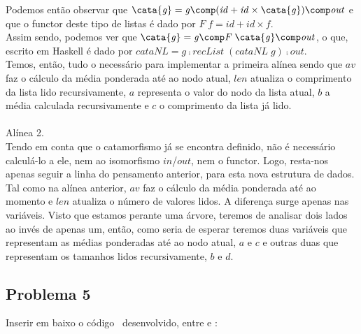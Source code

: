 \documentclass[a4paper]{article}
\newcommand{\Conid}[1]{\mathit{#1}}
\newcommand{\Varid}[1]{\mathit{#1}}
\begin{document}
Podemos então observar que $\ensuremath{\cata{\Varid{g}}\mathrel{=}\Varid{g}\comp (\Varid{id}\mathbin{+}\Varid{id}\times\cata{\Varid{g}})\comp \Varid{out}}$ e que o functor deste
tipo de listas é dado por $\ensuremath{\Conid{F}\;\Varid{f}\mathrel{=}\Varid{id}\mathbin{+}\Varid{id}\times\Varid{f}}$.\\
Assim sendo, podemos ver que $\ensuremath{\cata{\Varid{g}}\mathrel{=}\Varid{g}\comp \Conid{F}\;\cata{\Varid{g}}\comp \Varid{out}}$, o que, escrito em Haskell é dado
por $\ensuremath{\Varid{cataNL}\mathrel{=}\Varid{g}\comp \Varid{recList}\;(\Varid{cataNL}\;\Varid{g})\comp \Varid{out}}$.\\
Temos, então, tudo o necessário para implementar a primeira alínea sendo que $av$ faz o cálculo da média ponderada
até ao nodo atual, $len$ atualiza o comprimento da lista lido recursivamente, $a$ representa o valor
do nodo da lista atual, $b$ a média calculada recursivamente e $c$ o comprimento da lista já lido.
\\ \\
Alínea 2.
\\
Tendo em conta que o catamorfismo já se encontra definido, não é necessário calculá-lo a ele, nem ao isomorfismo 
$in$/$out$, nem o functor. Logo, resta-nos apenas seguir a linha do pensamento anterior, para esta nova estrutura de dados.\\
Tal como na alínea anterior, $av$ faz o cálculo da média ponderada até ao momento e $len$ atualiza o número de valores lidos.
A diferença surge apenas nas variáveis. Visto que estamos perante uma árvore, teremos de analisar dois lados ao invés de apenas um,
então, como seria de esperar teremos duas variáveis que representam as médias ponderadas até ao nodo atual, $a$ e $c$ e outras duas que
representam os tamanhos lidos recursivamente, $b$ e $d$.\\
\subsection*{Problema 5}
Inserir em baixo o código \Fsharp\ desenvolvido, entre  e :
\end{document}
